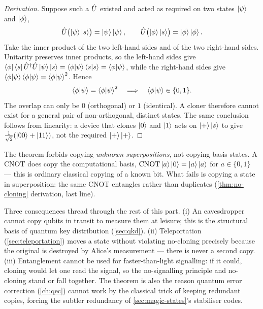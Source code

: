 \begin{proof}[Derivation]
Suppose such a $\hat{U}$ existed and acted as required on two states
$\ket{\psi}$ and $\ket{\phi}$,
\begin{equation}
\hat{U}\bigl(\ket{\psi}\ket{s}\bigr)=\ket{\psi}\ket{\psi},
\qquad
\hat{U}\bigl(\ket{\phi}\ket{s}\bigr)=\ket{\phi}\ket{\phi}.
\end{equation}
Take the inner product of the two left-hand sides and of the two
right-hand sides. Unitarity preserves inner products, so the left-hand
sides give
$\bra{\phi}\bra{s}\hat{U}^\dagger\hat{U}\ket{\psi}\ket{s}
=\braket{\phi}{\psi}\braket{s}{s}=\braket{\phi}{\psi}$,
while the right-hand sides give
$\braket{\phi}{\psi}\braket{\phi}{\psi}=\braket{\phi}{\psi}^2$.
Hence
\begin{equation}
\braket{\phi}{\psi}=\braket{\phi}{\psi}^2
\quad\Longrightarrow\quad
\braket{\phi}{\psi}\in\{0,1\}.
\end{equation}
The overlap can only be $0$ (orthogonal) or $1$ (identical). A cloner
therefore cannot exist for a general pair of non-orthogonal, distinct
states. The same conclusion follows from linearity: a device that
clones $\ket{0}$ and $\ket{1}$ acts on $\ket{+}\ket{s}$ to give
$\tfrac{1}{\sqrt2}(\ket{00}+\ket{11})$, not the required
$\ket{+}\ket{+}$.
\end{proof}

\begin{remark}
The theorem forbids copying \emph{unknown superpositions}, not copying
basis states. A CNOT does copy the computational basis,
$\mathrm{CNOT}\ket{a}\ket{0}=\ket{a}\ket{a}$ for $a\in\{0,1\}$ --- this
is ordinary classical copying of a known bit. What fails is copying a
state in superposition: the same CNOT entangles rather than duplicates
(\cref{thm:no-cloning} derivation, last line).
\end{remark}

\begin{application}
\label{app:no-cloning-uses}
Three consequences thread through the rest of this part. (i) An
eavesdropper cannot copy qubits in transit to measure them at leisure;
this is the structural basis of quantum key distribution
(\cref{sec:qkd}). (ii) Teleportation (\cref{sec:teleportation}) moves a
state without violating no-cloning precisely because the original is
destroyed by Alice's measurement --- there is never a second copy.
(iii) Entanglement cannot be used for faster-than-light signalling: if
it could, cloning would let one read the signal, so the no-signalling
principle and no-cloning stand or fall together. The theorem is also the
reason quantum error correction (\cref{ch:qec}) cannot work by the
classical trick of keeping redundant copies, forcing the subtler
redundancy of \cref{sec:magic-states}'s stabiliser codes.
\end{application}

